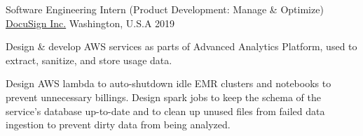 \begin{cventries}
  \cvwork
    {Software Engineering Intern (Product Development: Manage \& Optimize)} %
    {\href{https://www.docusign.com/}{DocuSign Inc.}} %
    {Washington, U.S.A} %
    {2019} %
    {
      \begin{cvitems} %
        \item {
          Design \& develop AWS services as parts of Advanced Analytics Platform, used to extract, sanitize, and store usage data.
        }
        \item {
          Design AWS lambda to auto-shutdown idle EMR clusters and notebooks to prevent unnecessary billings.
          Design spark jobs to keep the schema of the service's database up-to-date and to clean up unused files from failed data ingestion to prevent dirty data from being analyzed.
        }
      \end{cvitems}
    }

\end{cventries}
